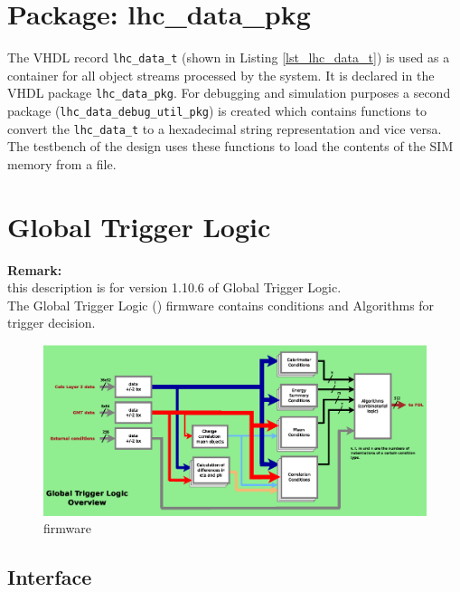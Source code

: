 \section{Package: lhc\_data\_pkg} \label{section_lhc_data_pkg}
The VHDL record \texttt{lhc\_data\_t} (shown in Listing \ref{lst_lhc_data_t}) is used as a container for all object streams processed by the system. It is declared in the VHDL package \texttt{lhc\_data\_pkg}.
For debugging and simulation purposes a second package (\texttt{lhc\_data\_debug\_util\_pkg}) is created which contains functions to convert the \texttt{lhc\_data\_t} to a hexadecimal string representation and vice versa.
The testbench of the design uses these functions to load the contents of the SIM memory from a file. 



\clearpage

\section{Global Trigger Logic}
\label{sec:gtl:global_trigger_logic}
\textbf{Remark:}\\
this description is for version 1.10.6 of Global Trigger Logic.\\

The Global Trigger Logic (\ugtl) firmware contains conditions and Algorithms for trigger decision.

\begin{figure}[htb]
\centering
\includegraphics[width=15cm]{figures/mGTL_firmware}
\caption{\ugtl firmware} 
\label{fig:gtl:mGTL_firmware}
\end{figure}

\subsection{\ugtl Interface}
\label{sec:gtl:ugtl_interface}

